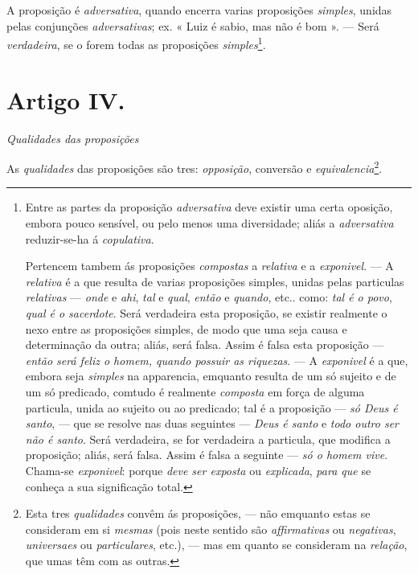 A proposição é \emph{adversativa}, quando encerra varias proposições \emph{simples}, unidas pelas conjunções \emph{adversativas}; ex. « Luiz é sabio, mas não é bom ». --- Será \emph{verdadeira}, se o forem todas as proposições \emph{simples}\footnote{Entre as partes da proposição \emph{adversativa} deve existir uma certa oposição, embora pouco sensível, ou pelo menos uma diversidade; aliás a \emph{adversativa} reduzir-se-ha á \emph{copulativa}.\par Pertencem tambem ás proposições \emph{compostas} a \emph{relativa} e a \emph{exponivel}. --- A \emph{relativa} é a que resulta de varias proposições simples, unidas pelas particulas \emph{relativas} --- \emph{onde} e \emph{ahi}, \emph{tal} e \emph{qual}, \emph{então} e \emph{quando}, etc.. como: \emph{tal é o povo}, \emph{qual é o sacerdote}. Será verdadeira esta proposição, se existir realmente o nexo entre as proposições simples, de modo que uma seja causa e determinação da outra; aliás, será falsa. Assim é falsa esta proposição --- \emph{então será feliz o homem, quando possuir as riquezas}. --- A \emph{exponivel} é a que, embora seja \emph{simples} na apparencia, emquanto resulta de um só sujeito e de um só predicado, comtudo é realmente \emph{composta} em força de alguma particula, unida ao sujeito ou ao predicado; tal é a proposição --- \emph{só Deus é santo}, --- que se resolve nas duas seguintes --- \emph{Deus é santo} e \emph{todo outro ser não é santo}. Será verdadeira, se for verdadeira a particula, que modifica a proposição; aliás, será falsa. Assim é falsa a seguinte --- \emph{só o homem vive}. Chama-se \emph{exponivel}: porque \emph{deve ser exposta} ou \emph{explicada}, \emph{para que} se conheça a sua significação total.}.


\section*{Artigo IV.}

 \emph{Qualidades das proposições}


As \emph{qualidades} das proposições são tres: \emph{opposição}, conversão e \emph{equivalencia}\footnote{Esta tres \emph{qualidades} convêm ás proposições, --- não emquanto estas se consideram em si \emph{mesmas} (pois neste sentido são \emph{affirmativas} ou \emph{negativas}, \emph{universaes} ou \emph{particulares}, etc.), --- mas em quanto se consideram na \emph{relação}, que umas têm com as outras.}.

